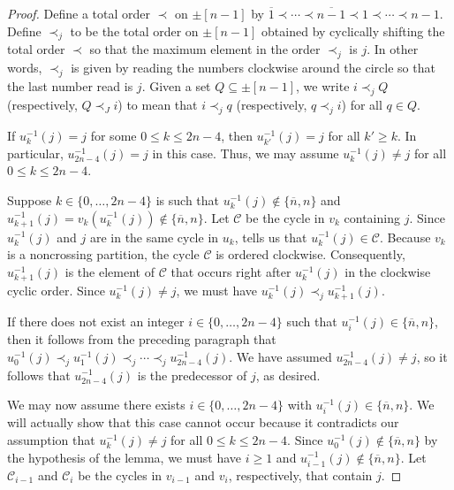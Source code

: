 \documentclass[10pt,a4paper]{amsart}
\begin{document}
\begin{proof}
Define a total order $\prec$ on $\pm[n-1]$ by $\overline 1\prec\cdots\prec\overline{n-1}\prec 1\prec\cdots\prec n-1$. Define $\prec_j$ to be the total order on $\pm[n-1]$ obtained by cyclically shifting the total order $\prec$ so that the maximum element in the order $\prec_j$ is $j$. In other words, $\prec_j$ is given by reading the numbers clockwise around the circle so that the last number read is $j$. Given a set $Q\subseteq\pm[n-1]$, we write $i\prec_j Q$ (respectively, $Q\prec_J i$) to mean that $i\prec_j q$ (respectively, $q\prec_j i$) for all $q\in Q$. 

If $u_k^{-1}(j)=j$ for some $0\leq k\leq 2n-4$, then $u_{k'}^{-1}(j)=j$ for all $k'\geq k$. In particular, $u_{2n-4}^{-1}(j)=j$ in this case. Thus, we may assume $u_k^{-1}(j)\neq j$ for all $0\leq k\leq 2n-4$.  

Suppose $k\in\{0,\ldots,2n-4\}$ is such that $u_k^{-1}(j)\not\in\{\overline n,n\}$ and $u_{k+1}^{-1}(j)=v_k(u_k^{-1}(j))\not\in\{\overline n,n\}$. Let $\mathcal C$ be the cycle in $v_k$ containing $j$. Since $u_k^{-1}(j)$ and $j$ are in the same cycle in $u_k$,  tells us that $u_k^{-1}(j)\in\mathcal C$. Because $v_k$ is a noncrossing partition, the cycle $\mathcal C$ is ordered clockwise. Consequently, $u_{k+1}^{-1}(j)$ is the element of $\mathcal C$ that occurs right after $u_k^{-1}(j)$ in the clockwise cyclic order. Since $u_k^{-1}(j)\neq j$, we must have $u_k^{-1}(j)\prec_j u_{k+1}^{-1}(j)$.

If there does not exist an integer $i\in\{0,\ldots,2n-4\}$ such that $u_i^{-1}(j)\in\{\overline n,n\}$, then it follows from the preceding paragraph that $u_0^{-1}(j)\prec_j u_1^{-1}(j)\prec_j\cdots\prec_j u_{2n-4}^{-1}(j)$. We have assumed $u_{2n-4}^{-1}(j)\neq j$, so it follows that $u_{2n-4}^{-1}(j)$ is the predecessor of $j$, as desired. 

We may now assume there exists $i\in\{0,\ldots,2n-4\}$ with $u_i^{-1}(j)\in\{\overline n,n\}$. We will actually show that this case cannot occur because it contradicts our assumption that $u_{k}^{-1}(j)\neq j$ for all $0\leq k\leq 2n-4$. Since $u_0^{-1}(j)\not\in\{\overline n,n\}$ by the hypothesis of the lemma, we must have $i\geq 1$ and $u_{i-1}^{-1}(j)\not\in\{\overline n,n\}$. Let $\mathcal C_{i-1}$ and $\mathcal C_i$ be the cycles in $v_{i-1}$ and $v_i$, respectively, that contain $j$. 


\end{proof}
\end{document}
